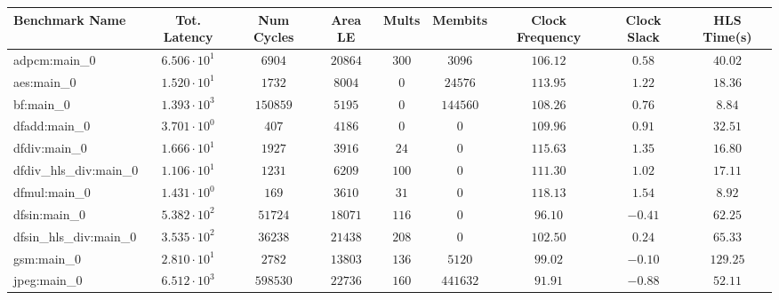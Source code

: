 \begin{tabular}{|l|c|c|c|c|c|c|c|c|}
\hline
Benchmark Name          & Tot. Latency           & Num Cycles & Area LE    & Mults    & Membits    & Clock Frequency & Clock Slack & HLS Time(s) \\
\hline
adpcm:main\_0           & $ 6.506 \cdot 10^{1} $ & $ 6904   $ & $ 20864  $ & $ 300  $ & $ 3096   $ & $ 106.12      $ & $ 0.58    $ & $ 40.02   $ \\
aes:main\_0             & $ 1.520 \cdot 10^{1} $ & $ 1732   $ & $ 8004   $ & $ 0    $ & $ 24576  $ & $ 113.95      $ & $ 1.22    $ & $ 18.36   $ \\
bf:main\_0              & $ 1.393 \cdot 10^{3} $ & $ 150859 $ & $ 5195   $ & $ 0    $ & $ 144560 $ & $ 108.26      $ & $ 0.76    $ & $ 8.84    $ \\
dfadd:main\_0           & $ 3.701 \cdot 10^{0} $ & $ 407    $ & $ 4186   $ & $ 0    $ & $ 0      $ & $ 109.96      $ & $ 0.91    $ & $ 32.51   $ \\
dfdiv:main\_0           & $ 1.666 \cdot 10^{1} $ & $ 1927   $ & $ 3916   $ & $ 24   $ & $ 0      $ & $ 115.63      $ & $ 1.35    $ & $ 16.80   $ \\
dfdiv\_hls\_div:main\_0 & $ 1.106 \cdot 10^{1} $ & $ 1231   $ & $ 6209   $ & $ 100  $ & $ 0      $ & $ 111.30      $ & $ 1.02    $ & $ 17.11   $ \\
dfmul:main\_0           & $ 1.431 \cdot 10^{0} $ & $ 169    $ & $ 3610   $ & $ 31   $ & $ 0      $ & $ 118.13      $ & $ 1.54    $ & $ 8.92    $ \\
dfsin:main\_0           & $ 5.382 \cdot 10^{2} $ & $ 51724  $ & $ 18071  $ & $ 116  $ & $ 0      $ & $ 96.10       $ & $ -0.41   $ & $ 62.25   $ \\
dfsin\_hls\_div:main\_0 & $ 3.535 \cdot 10^{2} $ & $ 36238  $ & $ 21438  $ & $ 208  $ & $ 0      $ & $ 102.50      $ & $ 0.24    $ & $ 65.33   $ \\
gsm:main\_0             & $ 2.810 \cdot 10^{1} $ & $ 2782   $ & $ 13803  $ & $ 136  $ & $ 5120   $ & $ 99.02       $ & $ -0.10   $ & $ 129.25  $ \\
jpeg:main\_0            & $ 6.512 \cdot 10^{3} $ & $ 598530 $ & $ 22736  $ & $ 160  $ & $ 441632 $ & $ 91.91       $ & $ -0.88   $ & $ 52.11   $ \\

\end{tabular}
